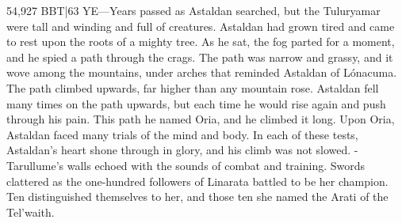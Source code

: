 \documentclass[smalldemyvopaper,11pt,twoside,onecolumn,openright,extrafontsizes]{memoir}
\begin{document}
{{54,927 BBT|63 YE—Years passed as Astaldan searched, but the Tuluryamar were tall and winding and full of creatures. Astaldan had grown tired and came to rest upon the roots of a mighty tree. As he sat, the fog parted for a moment, and he spied a path through the crags. The path was narrow and grassy, and it wove among the mountains, under arches that reminded Astaldan of Lónacuma. The path climbed upwards, far higher than any mountain rose. Astaldan fell many times on the path upwards, but each time he would rise again and push through his pain. This path he named Oria, and he climbed it long. Upon Oria, Astaldan faced many trials of the mind and body. In each of these tests, Astaldan’s heart shone through in glory, and his climb was not slowed.
-Tarullume’s walls echoed with the sounds of combat and training. Swords clattered as the one-hundred followers of Linarata battled to be her champion. Ten distinguished themselves to her, and those ten she named the Arati of the Tel’waith.

}}
\end{document}
